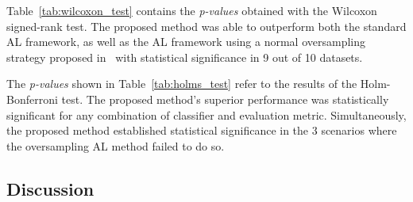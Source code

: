 \documentclass[parskip=full]{scrartcl}
\begin{document}
Table~\ref{tab:wilcoxon_test} contains the \textit{p-values} obtained with the
Wilcoxon signed-rank test. The proposed method was able to outperform both the
standard AL framework, as well as the AL framework using a normal oversampling
strategy proposed in~\cite{Fonseca2021} with statistical significance in 9 out
of 10 datasets.

\begin{table}[H]
	\centering
    \caption{%
        Adjusted p-values using the Wilcoxon signed-rank method. Bold values
        are statistically significant at a level of $\alpha = 0.05$. The null
        hypothesis is that the performance of the proposed framework is
        similar to that of the oversampling or standard framework.
    }\label{tab:wilcoxon_test}
\end{table}

The \textit{p-values} shown in Table~\ref{tab:holms_test} refer to the results
of the Holm-Bonferroni test. The proposed method's superior performance was
statistically significant for any combination of classifier and evaluation
metric. Simultaneously, the proposed method established statistical
significance in the 3 scenarios where the oversampling AL method failed to do
so.

\begin{table}[H]
	\centering
    \caption{%
		Adjusted p-values using the Holm-Bonferroni method. Bold values
        are statistically significant at a level of $\alpha = 0.05$. The 
        null hypothesis is that the tested method does not perform better 
        than the control method (benchmark AL framework).
    }\label{tab:holms_test}
\end{table}




\subsection{Discussion}~\label{sec:sub_discussion}
\end{document}
